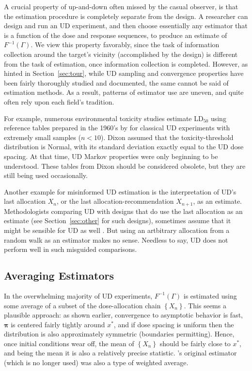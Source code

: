 A crucial property of up-and-down often missed by the casual observer, is that the estimation procedure is completely separate from the design. A researcher can design and run an UD experiment, and then choose essentially any estimator that is a function of the dose and response sequences, to produce an estimate of $F^{-1}(\Gamma)$. We view this property favorably, since the task of information collection around the target's vicinity (accomplished by the design) is different from the task of estimation, once information collection is completed. However, as hinted in Section~\ref{sec:tour}, while UD sampling and convergence properties have been fairly thoroughly studied and documented, the same cannot be said of estimation methods. As a result, patterns of estimator use are uneven, and quite often rely upon each field's tradition.

For example, numerous environmental toxicity studies \citep{Lich:updo:1998,Sund:Patr:Jull:Warn:Use:2004,Sween:etal:canines:2010} estimate LD$_{50}$ using reference tables prepared in the 1960's by \cite{Dixo:up-a:1965} for classical UD experiments with extremely small samples ($n<10$). Dixon assumed that the toxicity-threshold distribution is Normal, with its standard deviation exactly equal to the UD dose spacing. At that time, UD Markov properties were only beginning to be understood. These tables from Dixon should be considered obsolete, but they are still being used occasionally.

Another example for misinformed UD estimation is the interpretation of UD's last allocation $X_n$, or the last allocation-recommendation $X_{n+1}$, as an estimate.  Methodologists comparing UD with designs that do use the last allocation as an estimate (see Section~\ref{sec:other} for such designs), sometimes assume that it might be sensible for UD as well \citep{O'Qu:Chev:meth:1991,Zack:stag:2009}. But using an artbitrary allocation from a random walk as an estimator makes no sense. Needless to say, UD does not perform well in such misguided comparisons.

\subsection{Averaging Estimators}\label{sec:averaging}

In the overwhelming majority of UD experiments, $F^{-1}(\Gamma)$ is estimated using some average of a subset of the dose-allocation chain $\left\{X_n\right\}$. This seems a plausible approach: as shown earlier, convergence to asymptotic behavior is fast, $\boldsymbol{\pi}$ is centered fairly tightly around $x^*$, and if dose spacing is uniform then the distribution is also approximately symmetric (boundaries permitting). Hence, once initial conditions wear off, the mean of $\left\{X_n\right\}$ should be fairly close to $x^*$, and being the mean it is also a relatively precise statistic. \cite{Dixo:Mood:Amet:1948}'s original estimator (which is no longer used) was also a type of weighted average.

